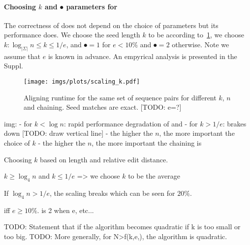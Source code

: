 \paragraph{Choosing $k$ and $\spot$ parameters for \astarpa}
The correctness of \astarpa does not depend on the choice of parameters but
its performance does. We choose the seed length $k$ to be according
to~\cref{GLOBALfig:scaling_k}, we choose $k: \log_{\lvert \Sigma \rvert} n \le k \le
1/e$, and $\spot = 1$ for $e < 10\%$ and $\spot=2$ otherwise. Note we assume that $e$ is
known in advance. An empyrical analysis is presented in the Suppl.

\begin{figure}[t]
    \centering
    \texttt{[image: imgs/plots/scaling\_k.pdf]}\label{GLOBALfig:scaling-k}
    \caption{Aligning runtime for the same set of sequence pairs for different $k$, $n$ and chaining. Seed matches are exact.  [TODO: e=?]}
    \label{GLOBALfig:scaling_k}
\end{figure}

img:
- for $k < \log n$: rapid performance degradation of \sh and 
- for $k > 1/e$: brakes down [TODO: draw vertical line]
- the higher the $n$, the more important the choice of $k$
- the higher the $n$, the more important the chaining is

Choosing $k$ based on length and relative edit
distance.

$k \ge \log_4 n$ and $k \le 1/e$ => we choose $k$ to be the average

If $\log_4 n > 1/e$, the scaling breaks which can be seen for $20\%$.

 iff $e \ge 10\%$.
\spot is 2 when e, etc...

TODO: Statement that if the algorithm
becomes quadratic if k is too small or too big.
TODO: More generally, for N>f(k,e,\spot), the algorithm is quadratic.
